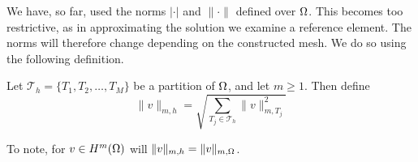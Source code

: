 We have, so far, used the norms $|\cdot|$ and $\|\cdot\|$ defined over $\Omega$. 
This becomes too restrictive, as in approximating the solution we examine a 
reference element. The norms will therefore change depending on the constructed 
mesh. We do so using the following definition.
\begin{defn}{\quad}
    Let $\mathcal{T}_h = \{ T_1,T_2,\ldots,T_M\}$ be a partition of $\Omega$, and 
    let $m\geq 1$. Then define 
    \begin{equation*}
        \|v\|_{m,h} = \sqrt{\sum_{T_j\in \mathcal{T}_h}\|v\|^2_{m,T_j}}
    \end{equation*}
\end{defn}
To note, for $v\in H^m(\Omega)$ will $\|v\|_{m,h}=\|v\|_{m,\Omega}$.